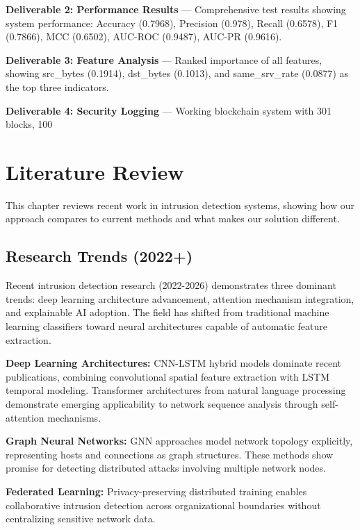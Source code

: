 \documentclass[12pt,a4paper]{report}
\begin{document}
\textbf{Deliverable 2: Performance Results} --- Comprehensive test results showing system performance: Accuracy (0.7968), Precision (0.978), Recall (0.6578), F1 (0.7866), MCC (0.6502), AUC-ROC (0.9487), AUC-PR (0.9616).

\textbf{Deliverable 3: Feature Analysis} --- Ranked importance of all features, showing src\_bytes (0.1914), dst\_bytes (0.1013), and same\_srv\_rate (0.0877) as the top three indicators.

\textbf{Deliverable 4: Security Logging} --- Working blockchain system with 301 blocks, 100%

\chapter{Literature Review}

This chapter reviews recent work in intrusion detection systems, showing how our approach compares to current methods and what makes our solution different.

\section{Research Trends (2022+)}

Recent intrusion detection research (2022-2026) demonstrates three dominant trends: deep learning architecture advancement, attention mechanism integration, and explainable AI adoption. The field has shifted from traditional machine learning classifiers toward neural architectures capable of automatic feature extraction.

\textbf{Deep Learning Architectures:} CNN-LSTM hybrid models dominate recent publications, combining convolutional spatial feature extraction with LSTM temporal modeling. Transformer architectures from natural language processing demonstrate emerging applicability to network sequence analysis through self-attention mechanisms.

\textbf{Graph Neural Networks:} GNN approaches model network topology explicitly, representing hosts and connections as graph structures. These methods show promise for detecting distributed attacks involving multiple network nodes.

\textbf{Federated Learning:} Privacy-preserving distributed training enables collaborative intrusion detection across organizational boundaries without centralizing sensitive network data.
\end{document}
